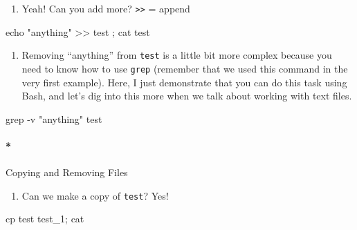 \documentclass[
  letterpaper,
  DIV=11,
  numbers=noendperiod]{scrreprt}
\let\oldparagraph\paragraph
\renewcommand{\paragraph}[1]{\oldparagraph{#1}\mbox{}}
\newenvironment{Shaded}{\begin{snugshade}}{\end{snugshade}}
\newcommand{\AttributeTok}[1]{\textcolor[rgb]{0.40,0.45,0.13}{#1}}
\newcommand{\BuiltInTok}[1]{\textcolor[rgb]{0.00,0.23,0.31}{#1}}
\newcommand{\FunctionTok}[1]{\textcolor[rgb]{0.28,0.35,0.67}{#1}}
\newcommand{\KeywordTok}[1]{\textcolor[rgb]{0.00,0.23,0.31}{#1}}
\newcommand{\NormalTok}[1]{\textcolor[rgb]{0.00,0.23,0.31}{#1}}
\newcommand{\OperatorTok}[1]{\textcolor[rgb]{0.37,0.37,0.37}{#1}}
\newcommand{\StringTok}[1]{\textcolor[rgb]{0.13,0.47,0.30}{#1}}
\providecommand{\tightlist}{%
  \setlength{\itemsep}{0pt}\setlength{\parskip}{0pt}}\usepackage{longtable,booktabs,array}
\begin{document}
\begin{enumerate}
\def\labelenumi{\arabic{enumi}.}
\setcounter{enumi}{5}
\tightlist
\item
  Yeah! Can you add more? \texttt{\textgreater{}\textgreater{}} = append
\end{enumerate}

\begin{Shaded}
\begin{Highlighting}[]

\BuiltInTok{echo} \StringTok{"anything"} \OperatorTok{\textgreater{}\textgreater{}}\NormalTok{ test }\KeywordTok{;} \FunctionTok{cat}\NormalTok{ test }
\end{Highlighting}
\end{Shaded}

\begin{enumerate}
\def\labelenumi{\arabic{enumi}.}
\setcounter{enumi}{6}
\tightlist
\item
  Removing ``anything'' from \texttt{test} is a little bit more complex
  because you need to know how to use \texttt{grep} (remember that we
  used this command in the very first example). Here, I just demonstrate
  that you can do this task using Bash, and let's dig into this more
  when we talk about working with text files.
\end{enumerate}

\begin{Shaded}
\begin{Highlighting}[]

\FunctionTok{grep} \AttributeTok{{-}v} \StringTok{"anything"}\NormalTok{ test}
\end{Highlighting}
\end{Shaded}

\hypertarget{copying-and-removing-files}{%
\paragraph*{Copying and Removing
Files}\label{copying-and-removing-files}}

\begin{enumerate}
\def\labelenumi{\arabic{enumi}.}
\tightlist
\item
  Can we make a copy of \texttt{test}? Yes!
\end{enumerate}

\begin{Shaded}
\begin{Highlighting}[]

\FunctionTok{cp}\NormalTok{ test test\_1}\KeywordTok{;} \FunctionTok{cat} 
\end{Highlighting}
\end{Shaded}
\end{document}

